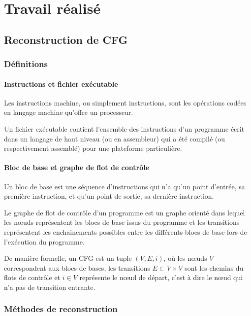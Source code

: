 \section{Travail réalisé}
\label{sec:work}
  \subsection{Reconstruction de CFG}
    \subsubsection{Définitions}
      \paragraph{Instructions et fichier exécutable}
      { Les instructions machine, ou simplement instructions, sont les
        opérations codées en langage machine qu'offre un processeur.

        Un fichier exécutable contient l'ensemble des instructions d'un
        programme écrit dans un langage de haut niveau (ou en assembleur) qui a
        été compilé (ou respectivement assemblé) pour une plateforme
        particulière. }
  
      \paragraph{Bloc de base et graphe de flot de contrôle}
      { Un bloc de base est une séquence d'instructions qui n'a qu'un point
        d'entrée, sa première instruction, et qu'un point de sortie, sa dernière
        instruction.

        Le graphe de flot de contrôle d'un programme est un graphe orienté dans
        lequel les n{\oe}uds représentent les blocs de base issus du programme
        et les transitions représentent les enchainements possibles entre les
        différents blocs de base lors de l'exécution du programme.
    
        De manière formelle, un CFG est un tuple $(V, E, i)$, où les n{\oe}uds
        $V$ correspondent aux blocs de bases, les transitions $E \subset V
        \times V$ sont les chemins du flots de contrôle et $i \in V$ représente
        le n{\oe}ud de départ, c'est à dire le n{\oe}ud qui n'a pas de
        transition entrante. }

    \subsubsection{Méthodes de reconstruction}


